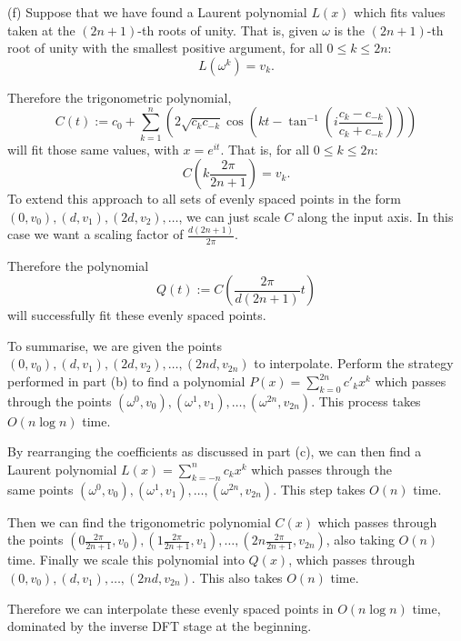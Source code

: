 \documentclass{article}
\begin{document}
\pagebreak
\begin{solution}

    (f) Suppose that we have found a Laurent polynomial $L(x)$ which fits values taken at the $(2n + 1)$-th roots of unity.
    That is, given $\omega$ is the $(2n+1)$-th root of unity with the smallest positive argument, for all $0\leq k \leq 2n$:
    $$L(\omega^k)=v_{k}.$$

    Therefore the trigonometric polynomial,
    $$C(t):=c_0+\sum_{k=1}^{n}\left(2\sqrt{c_kc_{-k}}\cos\left(kt-\tan^{-1}\left(i\frac{c_k-c_{-k}}{c_k+c_{-k}}\right)\right)\right)$$
    will fit those same values, with $x=e^{it}$. That is, for all $0\leq k \leq 2n$:
    $$C\left(k\frac{2\pi}{2n+1}\right)=v_k.$$
    To extend this approach to all sets of evenly spaced points in the form $(0, v_0), (d, v_1), (2d, v_2),\dots$, we can just scale $C$ along the input axis.
    In this case we want a scaling factor of $\frac{d(2n+1)}{2\pi}$.

    Therefore the polynomial 
    $$Q(t) := C\left(\frac{2\pi}{d(2n+1)}t\right)$$
    will successfully fit these evenly spaced points.

    To summarise, we are given the points $(0, v_0), (d, v_1), (2d, v_2),\dots, (2nd, v_{2n})$ to interpolate.
    Perform the strategy performed in part (b) to find a polynomial $P(x)=\sum_{k=0}^{2n}c'_kx^k$ which passes 
    through the points $(\omega^0, v_0), (\omega^1, v_1), \dots, (\omega^{2n}, v_{2n})$.
    This process takes $O(n\log n)$ time.
    
    By rearranging the coefficients as discussed in part (c), 
    we can then find a \\Laurent polynomial $L(x) = \sum_{k=-n}^{n}c_kx^k$ which passes through the \\same points $(\omega^0, v_0), (\omega^1, v_1), \dots, (\omega^{2n}, v_{2n})$.
    This step takes $O(n)$ time. 

    Then we can find the trigonometric polynomial $C(x)$ which passes through \\the points $(0\frac{2\pi}{2n+1}, v_0), (1\frac{2\pi}{2n+1}, v_1), \dots, (2n\frac{2\pi}{2n+1}, v_{2n})$,
    also taking $O(n)$ time. Finally we scale this polynomial into $Q(x)$, which passes through $(0, v_0), (d, v_1), \dots, (2nd, v_{2n})$. This also takes $O(n)$ time.

    Therefore we can interpolate these evenly spaced points in $O(n\log n)$ time, dominated by the inverse DFT stage at the beginning.


\end{solution}
\end{document}
